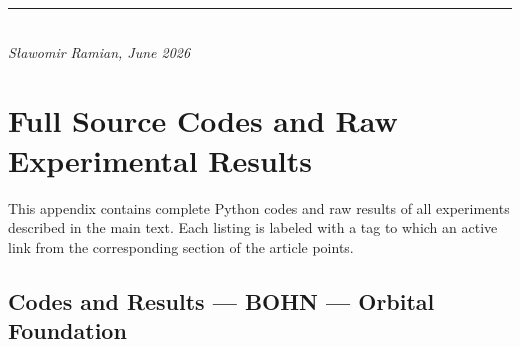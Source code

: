 \documentclass[11pt,a4paper]{report}
\begin{document}
\begin{center}
\rule{0.5\textwidth}{0.4pt}\\[6pt]
\textit{Sławomir Ramian, June 2026}
\end{center}


\newpage




\appendix

\chapter{Full Source Codes and Raw Experimental Results}
\label{app:codes}

This appendix contains complete Python codes and raw results of all experiments described in the main text. Each listing is labeled with a tag to which an active link from the corresponding section of the article points.

\section{Codes and Results --- BOHN --- Orbital Foundation}
\end{document}
